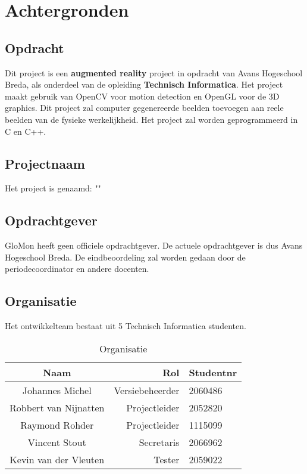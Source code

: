 
\chapter{Achtergronden} \label{cha:achtergrond}

\section{Opdracht} \label{sec:opdracht}

Dit project is een \textbf{augmented reality} project in opdracht van Avans Hogeschool Breda, als onderdeel van de opleiding \textbf{Technisch Informatica}. Het project maakt gebruik van OpenCV voor motion detection en OpenGL voor de 3D graphics. Dit project zal computer gegenereerde beelden toevoegen aan reele beelden van de fysieke werkelijkheid. Het project zal worden geprogrammeerd in C en C++.

\section{Projectnaam} \label{sec:projectnaam}
Het project is genaamd: "\projectname"

\section{Opdrachtgever} \label{sec:opdrachtgever}
GloMon heeft geen officiele opdrachtgever. De actuele opdrachtgever is dus Avans Hogeschool Breda. De eindbeoordeling zal worden gedaan door de periodecoordinator en andere docenten.

\section{Organisatie} \label{sec:organisatie}
Het ontwikkelteam bestaat uit 5 Technisch Informatica studenten.
\begin{table}[h]
  \centering
  \caption{Organisatie}
  \label{tb:table}
  \begin{tabular}{crl}
    \toprule
    Naam     		& Rol			& Studentnr\\
    \midrule
    Johannes Michel	& Versiebeheerder		& 2060486\\
    Robbert van Nijnatten	& Projectleider	& 2052820\\
    Raymond Rohder	& Projectleider	& 1115099\\
    Vincent Stout	& Secretaris	& 2066962\\
    Kevin van der Vleuten	& Tester	& 2059022\\
    \bottomrule
  \end{tabular}
\end{table}

